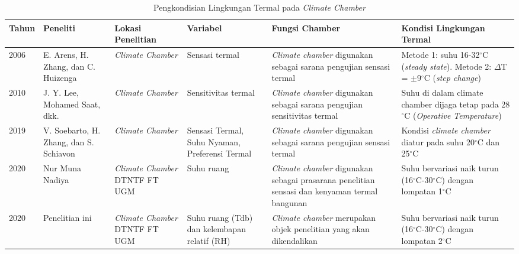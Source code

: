 \begin{landscape}
	\begin{table}[t]
		\caption{Pengkondisian Lingkungan Termal pada \textit{Climate Chamber}}
		\centering
		\label{tbl:2:studichamber}
		\begin{tabular}{|p{1cm}|p{2.6cm}|p{3cm}|p{3cm}|p{6cm}|p{5.5cm}|}
			\hline
			Tahun & Peneliti & Lokasi Penelitian & Variabel & Fungsi Chamber & Kondisi Lingkungan Termal \\ \hline
			
			2006 \cite{paper21Arens} & E. Arens, H. Zhang, dan C. Huizenga & \textit{Climate Chamber} & Sensasi termal & \textit{Climate chamber} digunakan sebagai sarana pengujian sensasi termal & Metode 1: suhu 16-32$^{\circ}$C (\textit{steady state}). Metode 2: $\Delta$T = $\pm$9$^{\circ}$C (\textit{step change}) \\ \hline
			
			2010 \cite{paper21JYLee} & J. Y. Lee, Mohamed Saat, dkk. &\textit{Climate Chamber} & Sensitivitas termal & \textit{Climate chamber} digunakan sebagai sarana pengujian sensitivitas termal & Suhu di dalam climate chamber dijaga tetap pada 28$^{\circ}$C (\textit{Operative Temperature}) \\ \hline
			
			2019 \cite{paper21Veronica} & V. Soebarto, H. Zhang, dan S. Schiavon &\textit{Climate Chamber} & Sensasi Termal, Suhu Nyaman, Preferensi Termal & \textit{Climate chamber} digunakan sebagai sarana pengujian sensasi termal & Kondisi \textit{climate chamber} diatur pada suhu 20$^\circ$C dan 25$^\circ$C \\ \hline
			
			2020 \cite{skripsiMuna} & Nur Muna Nadiya & \textit{Climate Chamber} DTNTF FT UGM & Suhu ruang & \textit{Climate chamber} digunakan sebagai prasarana penelitian sensasi dan kenyaman termal bangunan & Suhu bervariasi naik turun (16$^{\circ}$C-30$^{\circ}$C) dengan lompatan 1$^{\circ}$C\\ \hline
			
			2020 & Penelitian ini & \textit{Climate Chamber} DTNTF FT UGM & Suhu ruang (Tdb) dan kelembapan relatif (RH) & \textit{Climate chamber} merupakan objek penelitian yang akan dikendalikan & Suhu bervariasi naik turun (16$^{\circ}$C-30$^{\circ}$C) dengan lompatan 2$^{\circ}$C\\ \hline
		\end{tabular}
	\end{table}
\end{landscape}

